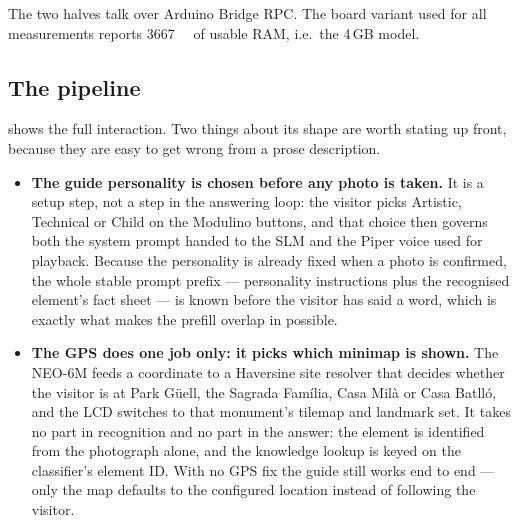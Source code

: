 \documentclass[11pt,a4paper]{article}
\begin{document}
The two halves talk over Arduino Bridge RPC. The board variant used for all
measurements reports \SI{3667}{\mega\byte} of usable RAM, i.e.\ the 4\,GB
model.

\subsection{The pipeline}

 shows the full interaction. Two things about its
shape are worth stating up front, because they are easy to get wrong from a
prose description.

\begin{itemize}
  \item \textbf{The guide personality is chosen before any photo is taken.}
        It is a setup step, not a step in the answering loop: the visitor picks
        Artistic, Technical or Child on the Modulino buttons, and that choice
        then governs both the system prompt handed to the SLM and the Piper
        voice used for playback. Because the personality is already fixed when
        a photo is confirmed, the whole stable prompt prefix --- personality
        instructions plus the recognised element's fact sheet --- is known
        before the visitor has said a word, which is exactly what makes the
        prefill overlap in  possible.
  \item \textbf{The GPS does one job only: it picks which minimap is shown.}
        The NEO-6M feeds a coordinate to a Haversine site resolver that decides
        whether the visitor is at Park G\"uell, the Sagrada Fam\'ilia, Casa
        Mil\`a or Casa Batll\'o, and the LCD switches to that monument's
        tilemap and landmark set. It takes no part in recognition and no part
        in the answer: the element is identified from the photograph alone, and
        the knowledge lookup is keyed on the classifier's element ID. With no
        GPS fix the guide still works end to end --- only the map defaults to
        the configured location instead of following the visitor.
\end{itemize}
\end{document}
